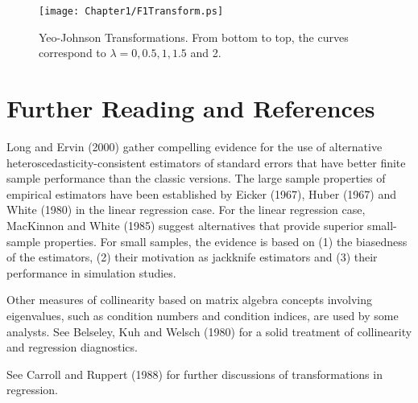 \begin{figure}[htp]
  \centering
    \texttt{[image: Chapter1/F1Transform.ps]}
\caption{\label{F1:Transform} \small Yeo-Johnson Transformations.
From bottom to top, the curves correspond to $\lambda =0,0.5,1,1.5$
and 2.}
\end{figure}



\section{Further Reading and References}

Long and Ervin (2000) gather compelling evidence for the use of
alternative \newline heteroscedasticity-consistent estimators of
standard errors that have better finite sample performance than the
classic versions. The large sample properties of empirical
estimators have been established by Eicker (1967), Huber (1967) and
White (1980) in the linear regression case. For the linear
regression case, MacKinnon and White (1985) suggest alternatives
that provide superior small-sample properties. For small samples,
the evidence is based on (1) the biasedness of the estimators, (2)
their motivation as jackknife estimators and (3) their performance
in simulation studies.

Other measures of collinearity based on matrix algebra concepts
involving eigenvalues, such as condition numbers and condition
indices, are used by some analysts. See Belseley, Kuh and Welsch
(1980) for a solid treatment of collinearity and regression
diagnostics.

See Carroll and Ruppert (1988) for further discussions of
transformations in regression.

\bigskip

